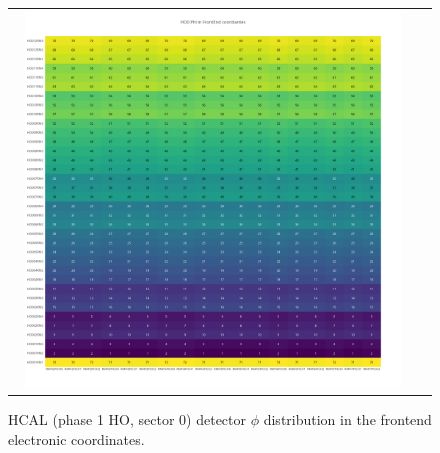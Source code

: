 \begin{figure}[htb]
 \begin{center}
  \begin{tabular}{cc}
   \includegraphics[angle=0,width=0.95\textwidth]{figures/appendix/HO0_Phi_in_FrontEnd.png}
  \end{tabular}
	\caption{HCAL (phase 1 HO, sector 0) detector $\phi$ distribution in the frontend electronic coordinates.}
  \label{fig:lmapHO0PhiFEC}
 \end{center}
\end{figure}
\clearpage

